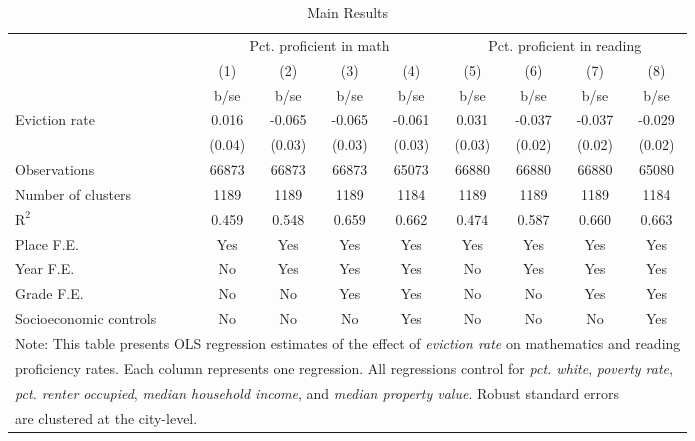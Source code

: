 \begin{table}[htbp]\centering
\def\sym#1{\ifmmode^{#1}\else\(^{#1}\)\fi}
\caption{Main Results}
\begin{tabular}{l*{8}{c}}
\toprule
                    &\multicolumn{4}{c}{Pct. proficient in math}        &\multicolumn{4}{c}{Pct. proficient in reading}     \\\cmidrule(lr){2-5}\cmidrule(lr){6-9}
                    &\multicolumn{1}{c}{(1)}&\multicolumn{1}{c}{(2)}&\multicolumn{1}{c}{(3)}&\multicolumn{1}{c}{(4)}&\multicolumn{1}{c}{(5)}&\multicolumn{1}{c}{(6)}&\multicolumn{1}{c}{(7)}&\multicolumn{1}{c}{(8)}\\
                    &        b/se&        b/se&        b/se&        b/se&        b/se&        b/se&        b/se&        b/se\\
\midrule
Eviction rate       &       0.016&      -0.065&      -0.065&      -0.061&       0.031&      -0.037&      -0.037&      -0.029\\
                    &      (0.04)&      (0.03)&      (0.03)&      (0.03)&      (0.03)&      (0.02)&      (0.02)&      (0.02)\\
\midrule
Observations        &       66873&       66873&       66873&       65073&       66880&       66880&       66880&       65080\\
Number of clusters  &        1189&        1189&        1189&        1184&        1189&        1189&        1189&        1184\\
$\text{R}^2$        &       0.459&       0.548&       0.659&       0.662&       0.474&       0.587&       0.660&       0.663\\
Place F.E.          &         Yes&         Yes&         Yes&         Yes&         Yes&         Yes&         Yes&         Yes\\
Year F.E.           &          No&         Yes&         Yes&         Yes&          No&         Yes&         Yes&         Yes\\
Grade F.E.          &          No&          No&         Yes&         Yes&          No&          No&         Yes&         Yes\\
Socioeconomic controls&          No&          No&          No&         Yes&          No&          No&          No&         Yes\\
\bottomrule
\multicolumn{9}{l}{\footnotesize Note: This table presents OLS regression estimates of the effect of \emph{eviction rate} on mathematics and reading}\\
\multicolumn{9}{l}{\footnotesize proficiency rates. Each column represents one regression. All regressions control for \emph{pct. white}, \emph{poverty rate},}\\
\multicolumn{9}{l}{\footnotesize \emph{pct. renter occupied}, \emph{median household income}, and \emph{median property value}. Robust standard errors}\\
\multicolumn{9}{l}{\footnotesize are clustered at the city-level.}\\
\end{tabular}
\end{table}
